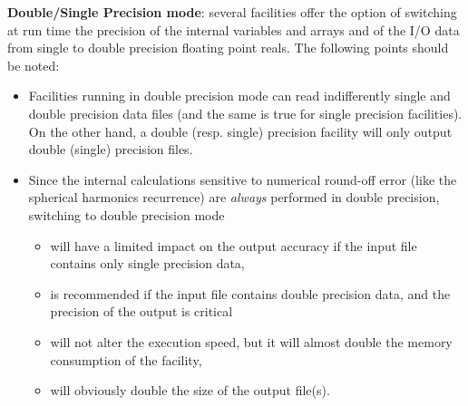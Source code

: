\documentclass[12pt,twoside]{article}
\begin{document}
\vskip 1cm
{\bf {Double/Single Precision mode}}: several facilities offer the option of switching at run time 
the precision of the internal variables and arrays and of the I/O data from single to double precision
floating point reals. The following points should be noted: \label{page:ioprec}
\begin{itemize}
\item Facilities running in double precision mode can read indifferently single and double
  precision data files (and the same is true for single precision facilities). On
  the other hand, a double (resp. single) precision facility will only output double
  (single) precision  files.
\item Since the internal calculations sensitive to numerical round-off error
  (like the spherical harmonics recurrence) are
  {\em always} performed in double precision, switching to double precision mode
\begin{itemize}
\item   will have a limited impact on the output accuracy if the input file contains only
  single precision data,
\item is recommended if the input file contains double precision data, and the precision of the output is critical
\item will not alter the execution speed, but
  it will almost double the memory consumption of the facility,
\item will obviously double the size of the output file(s).
\end{itemize}
\end{itemize}
\end{document}
